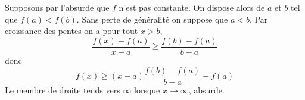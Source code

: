 \documentclass{report}
\begin{document}
\subsection{} \noindent{}\\ 
\\ 
\\
\noindent Supposons par l'absurde que $f$ n'est pas constante. On dispose alors de $a$ et $b$ tel que $f(a)< f(b)$. Sans perte de généralité on suppose que $a<b$. Par croissance des pentes on a pour tout $x>b$, $$\frac{f(x)-f(a)}{x-a} \geq \frac{f(b)-f(a)}{b-a}$$
donc 
$$f(x)\geq (x-a)\frac{f(b)-f(a)}{b-a} + f(a)$$
Le membre de droite tends vers $\infty$ lorsque $x\to \infty$, absurde.
\end{document}
